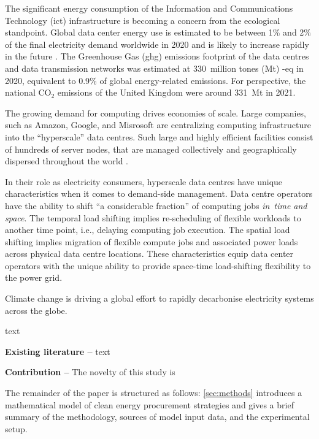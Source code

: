 The significant energy consumption of the Information and Communications Technology (\gls{ict}) infrastructure is becoming a concern from the ecological standpoint. Global data center energy use is estimated to be between 1\% and 2\% of the final electricity demand worldwide in 2020 \cite{davidmyttonHowMuchEnergy2020, masanetRecalibratingGlobalData2020} and is likely to increase rapidly in the future \cite{andraeGlobalElectricityUsage2015}. The Greenhouse Gas (\gls{ghg}) emissions footprint of the data centres and data transmission networks was estimated at 330~million tones (Mt) \co-eq in 2020, equivalent to 0.9\% of global energy-related emissions. \cite{ieaDataCentresData2023, malmodinICTSectorElectricity2023} For perspective, the national CO$_2$ emissions of the United Kingdom were around 331~Mt in 2021. \cite{UKnationalstats} 


The growing demand for computing drives economies of scale. Large companies, such as Amazon, Google, and Misrosoft are centralizing computing infrastructure into the \enquote{hyperscale} data centres. 
Such large and highly efficient facilities consist of hundreds of server nodes, that are managed collectively and geographically dispersed throughout the world \cite{ThereAre500}. 

In their role as electricity consumers, hyperscale data centres have unique characteristics when it comes to demand-side management. Data centre operators have the ability to shift \enquote{a considerable fraction} of computing jobs \textit{in~time and space}. \cite{radovanovicIEEE2023} The temporal load shifting implies re-scheduling of flexible workloads to another time point, i.e., delaying computing job execution. The spatial load shifting implies migration of flexible compute jobs and associated power loads across physical data centre locations. These characteristics equip data center operators with the unique ability to provide space-time load-shifting flexibility to the power grid.

Climate change is driving a global effort to rapidly decarbonise electricity systems across the globe.

text


\textbf{Existing literature --}
text


\textbf{Contribution --} The novelty of this study is


The remainder of the paper is structured as follows: \cref{sec:methods} introduces a mathematical model of clean energy procurement strategies and gives a brief summary of the methodology, sources of model input data, and the experimental setup.
